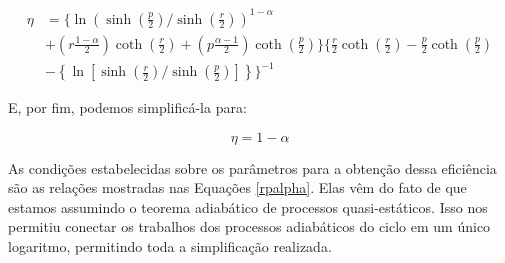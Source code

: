 \begin{equation}
\begin{split}
\eta &= \Bigg\{ \ln \left( \sinh \left( \frac{p}{2} \right) \bigg/ \sinh \left( \frac{r}{2} \right) \right)^{1-\alpha} \\&+ \left( r \frac{1 - \alpha }{2} \right) \coth \left( \frac{r}{2} \right) + \left( p \frac{\alpha - 1}{2} \right) \coth \left( \frac{p}{2} \right) \Bigg\} \Bigg\{ \frac{r}{2} \coth \left( \frac{r}{2} \right) - \frac{p}{2} \coth \left( \frac{p}{2} \right) \\& - \left\{ \ln \left[ \sinh \left( \frac{r}{2} \right) \Big/ \sinh \left( \frac{p}{2} \right) \right] \right\} \Bigg\}^{-1}
\end{split}
\end{equation}

E, por fim, podemos simplificá-la para:

\begin{equation}
\eta = 1-\alpha
\end{equation}

As condições estabelecidas sobre os parâmetros para a obtenção dessa eficiência são as relações mostradas nas Equações \eqref{rpalpha}. Elas vêm do fato de que estamos assumindo o teorema adiabático de processos quasi-estáticos. Isso nos permitiu conectar os trabalhos dos processos adiabáticos do ciclo em um único logaritmo, permitindo toda a simplificação realizada.